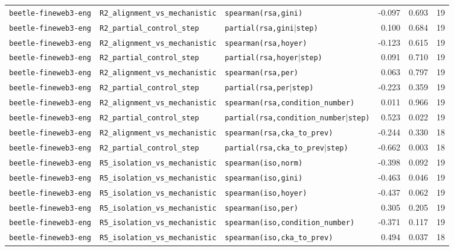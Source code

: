 \begin{longtable}{lllrrr}
\texttt{beetle-fineweb3-eng} & \texttt{R2\_alignment\_vs\_mechanistic} & \texttt{spearman(rsa,gini)} & -0.097 & 0.693 & 19 \\
\texttt{beetle-fineweb3-eng} & \texttt{R2\_partial\_control\_step} & \texttt{partial(rsa,gini$\mid$step)} & 0.100 & 0.684 & 19 \\
\texttt{beetle-fineweb3-eng} & \texttt{R2\_alignment\_vs\_mechanistic} & \texttt{spearman(rsa,hoyer)} & -0.123 & 0.615 & 19 \\
\texttt{beetle-fineweb3-eng} & \texttt{R2\_partial\_control\_step} & \texttt{partial(rsa,hoyer$\mid$step)} & 0.091 & 0.710 & 19 \\
\texttt{beetle-fineweb3-eng} & \texttt{R2\_alignment\_vs\_mechanistic} & \texttt{spearman(rsa,per)} & 0.063 & 0.797 & 19 \\
\texttt{beetle-fineweb3-eng} & \texttt{R2\_partial\_control\_step} & \texttt{partial(rsa,per$\mid$step)} & -0.223 & 0.359 & 19 \\
\texttt{beetle-fineweb3-eng} & \texttt{R2\_alignment\_vs\_mechanistic} & \texttt{spearman(rsa,condition\_number)} & 0.011 & 0.966 & 19 \\
\texttt{beetle-fineweb3-eng} & \texttt{R2\_partial\_control\_step} & \texttt{partial(rsa,condition\_number$\mid$step)} & 0.523 & 0.022 & 19 \\
\texttt{beetle-fineweb3-eng} & \texttt{R2\_alignment\_vs\_mechanistic} & \texttt{spearman(rsa,cka\_to\_prev)} & -0.244 & 0.330 & 18 \\
\texttt{beetle-fineweb3-eng} & \texttt{R2\_partial\_control\_step} & \texttt{partial(rsa,cka\_to\_prev$\mid$step)} & -0.662 & 0.003 & 18 \\
\texttt{beetle-fineweb3-eng} & \texttt{R5\_isolation\_vs\_mechanistic} & \texttt{spearman(iso,norm)} & -0.398 & 0.092 & 19 \\
\texttt{beetle-fineweb3-eng} & \texttt{R5\_isolation\_vs\_mechanistic} & \texttt{spearman(iso,gini)} & -0.463 & 0.046 & 19 \\
\texttt{beetle-fineweb3-eng} & \texttt{R5\_isolation\_vs\_mechanistic} & \texttt{spearman(iso,hoyer)} & -0.437 & 0.062 & 19 \\
\texttt{beetle-fineweb3-eng} & \texttt{R5\_isolation\_vs\_mechanistic} & \texttt{spearman(iso,per)} & 0.305 & 0.205 & 19 \\
\texttt{beetle-fineweb3-eng} & \texttt{R5\_isolation\_vs\_mechanistic} & \texttt{spearman(iso,condition\_number)} & -0.371 & 0.117 & 19 \\
\texttt{beetle-fineweb3-eng} & \texttt{R5\_isolation\_vs\_mechanistic} & \texttt{spearman(iso,cka\_to\_prev)} & 0.494 & 0.037 & 18 \\

\end{longtable}
